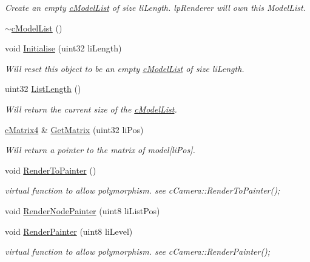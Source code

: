 \begin{DoxyCompactItemize}
\begin{DoxyCompactList}\small\item\em Create an empty \hyperlink{classc_model_list}{cModelList} of size liLength. lpRenderer will own this ModelList. \item\end{DoxyCompactList}\item 
\hyperlink{classc_model_list_a0b5881b19b9b483ef35433b3796e9487}{$\sim$cModelList} ()
\item 
void \hyperlink{classc_model_list_a7420fd714a029735c859f94436a103b8}{Initialise} (uint32 liLength)
\begin{DoxyCompactList}\small\item\em Will reset this object to be an empty \hyperlink{classc_model_list}{cModelList} of size liLength. \item\end{DoxyCompactList}\item 
uint32 \hyperlink{classc_model_list_a5026c264a3233d8191099f0d8305b26b}{ListLength} ()
\begin{DoxyCompactList}\small\item\em Will return the current size of the \hyperlink{classc_model_list}{cModelList}. \item\end{DoxyCompactList}\item 
\hyperlink{classc_matrix4}{cMatrix4} \& \hyperlink{classc_model_list_a6a6f16e76baee589d1b0a768511d8ebf}{GetMatrix} (uint32 liPos)
\begin{DoxyCompactList}\small\item\em Will return a pointer to the matrix of model\mbox{[}liPos\mbox{]}. \item\end{DoxyCompactList}\item 
void \hyperlink{classc_model_list_a529148930b0fd87ab2b437a469c69bce}{RenderToPainter} ()
\begin{DoxyCompactList}\small\item\em virtual function to allow polymorphism. see cCamera::RenderToPainter(); \item\end{DoxyCompactList}\item 
void \hyperlink{classc_model_list_a08b64e8813d678ebb2b83f00c7b1196b}{RenderNodePainter} (uint8 liListPos)
\item 
void \hyperlink{classc_model_list_a99c8897efa4a08778fa9ce90cacfd6a4}{RenderPainter} (uint8 liLevel)
\begin{DoxyCompactList}\small\item\em virtual function to allow polymorphism. see cCamera::RenderPainter(); \item\end{DoxyCompactList}\item 

\end{DoxyCompactItemize}
